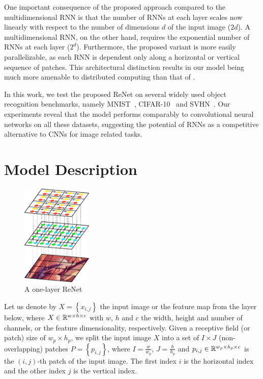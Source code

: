One important consequence of the proposed approach compared to the
multidimensional RNN is that the number of RNNs at each layer scales now linearly
with respect to the number of dimensions $d$ of the input image ($2d$). A
multidimensional RNN, on the other hand, requires the exponential number of RNNs
at each layer ($2^d$). Furthermore, the proposed variant is more easily
parallelizable, as each RNN is dependent only along a horizontal or vertical
sequence of patches. This architectural distinction results in our model being
much more amenable to distributed computing than that of
\citet{Graves+Schmidhuber-2009}.

In this work, we test the proposed ReNet on several widely used object
recognition benchmarks, namely  MNIST~\citep{Lecun99objectrecognition},
CIFAR-10~\citep{KrizhevskyHinton2009} and SVHN~\citep{Netzer-wkshp-2011}. Our
experiments reveal that the model performs comparably to convolutional neural
networks on all these datasets,
suggesting the potential of RNNs as a competitive alternative to CNNs for image
related tasks.

\section{Model Description}

\begin{figure}
    \centering
    \includegraphics[width=0.3\textwidth]{pdf/renet_first_layer.pdf}
    \caption{A one-layer ReNet}
    \label{fig:networklayer}
    \vspace{-3mm}
\end{figure}

Let us denote by $X=\left\{x_{i,j}\right\}$ the input image or the feature map
from the layer below, where $X \in \mathbb{R}^{w \times h \times c}$ with $w$, $h$ and
$c$ the width, height and number of channels, or the feature dimensionality,
respectively. Given a receptive field (or patch) size of $w_p \times h_p$, we
split the input image $X$ into a set of $I \times J$ (non-overlapping) patches
$P = \left\{ p_{i,j} \right\}$, where $I = \frac{w}{w_p}$, $J = \frac{h}{h_p}$
and $p_{i,j} \in \mathbb{R}^{w_p \times h_p \times c}$ is the $(i,j)$-th patch of the
input image. The first index $i$ is the horizontal index and the other index
$j$ is the vertical index.

